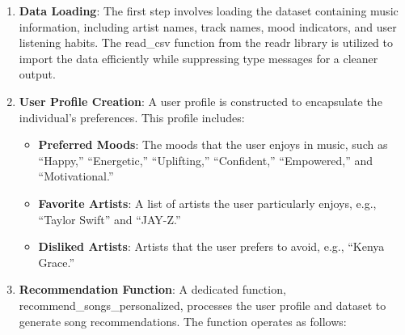 \documentclass[
]{article}
\begin{document}
\begin{enumerate}
\def\labelenumi{\arabic{enumi}.}
\item
  \textbf{Data Loading}: The first step involves loading the dataset
  containing music information, including artist names, track names,
  mood indicators, and user listening habits. The read\_csv function
  from the readr library is utilized to import the data efficiently
  while suppressing type messages for a cleaner output.
\item
  \textbf{User Profile Creation}: A user profile is constructed to
  encapsulate the individual's preferences. This profile includes:

  \begin{itemize}
  \item
    \textbf{Preferred Moods}: The moods that the user enjoys in music,
    such as ``Happy,'' ``Energetic,'' ``Uplifting,'' ``Confident,''
    ``Empowered,'' and ``Motivational.''
  \item
    \textbf{Favorite Artists}: A list of artists the user particularly
    enjoys, e.g., ``Taylor Swift'' and ``JAY-Z.''
  \item
    \textbf{Disliked Artists}: Artists that the user prefers to avoid,
    e.g., ``Kenya Grace.''
  \end{itemize}
\item
  \textbf{Recommendation Function}: A dedicated function,
  recommend\_songs\_personalized, processes the user profile and dataset
  to generate song recommendations. The function operates as follows:


\end{enumerate}
\end{document}
